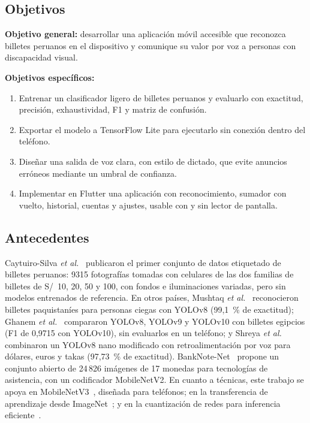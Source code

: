 \documentclass[conference,a4paper]{IEEEtran}
\begin{document}
\subsection{Objetivos}

\textbf{Objetivo general:} desarrollar una aplicación móvil accesible que reconozca billetes peruanos en el dispositivo y comunique su valor por voz a personas con discapacidad visual.

\textbf{Objetivos específicos:}
\begin{enumerate}
\item Entrenar un clasificador ligero de billetes peruanos y evaluarlo con exactitud, precisión, exhaustividad, F1 y matriz de confusión.
\item Exportar el modelo a TensorFlow Lite para ejecutarlo sin conexión dentro del teléfono.
\item Diseñar una salida de voz clara, con estilo de dictado, que evite anuncios erróneos mediante un umbral de confianza.
\item Implementar en Flutter una aplicación con reconocimiento, sumador con vuelto, historial, cuentas y ajustes, usable con y sin lector de pantalla.
\end{enumerate}

\subsection{Antecedentes}

Caytuiro-Silva \emph{et al.}~\cite{caytuiro2023,mendeley2023} publicaron el primer conjunto de datos etiquetado de billetes peruanos: 9315 fotografías tomadas con celulares de las dos familias de billetes de S/~10, 20, 50 y 100, con fondos e iluminaciones variadas, pero sin modelos entrenados de referencia. En otros países, Mushtaq \emph{et al.}~\cite{mushtaq2025} reconocieron billetes paquistaníes para personas ciegas con YOLOv8 (99,1~\% de exactitud); Ghanem \emph{et al.}~\cite{ghanem2025} compararon YOLOv8, YOLOv9 y YOLOv10 con billetes egipcios (F1 de 0,9715 con YOLOv10), sin evaluarlos en un teléfono; y Shreya \emph{et al.}~\cite{shreya2025} combinaron un YOLOv8 nano modificado con retroalimentación por voz para dólares, euros y takas (97,73~\% de exactitud). BankNote-Net~\cite{oviedo2022} propone un conjunto abierto de 24\,826 imágenes de 17 monedas para tecnologías de asistencia, con un codificador MobileNetV2. En cuanto a técnicas, este trabajo se apoya en MobileNetV3~\cite{howard2019}, diseñada para teléfonos; en la transferencia de aprendizaje desde ImageNet~\cite{yosinski2014,deng2009}; y en la cuantización de redes para inferencia eficiente~\cite{jacob2018}.
\end{document}
